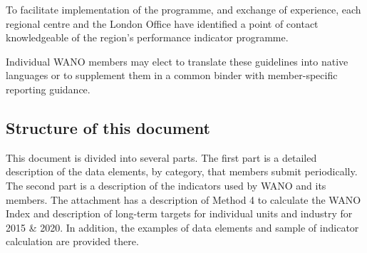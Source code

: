 To facilitate implementation of the programme, and exchange of
experience, each regional centre and the London Office have identified
a point of contact knowledgeable of the region's performance indicator
programme.

Individual WANO members may elect to translate these guidelines into native languages or to supplement them in a common binder with member-specific reporting guidance.
\subsection*{Structure of this document}
This document is divided into several parts. The first part is a detailed description of the data elements, by category, that members submit periodically. The second part is a description of the indicators used by WANO and its members. The attachment has a description of Method 4 to calculate the WANO Index and description of long-term targets for individual units and industry for 2015 \& 2020. In addition, the examples of data elements and sample of indicator calculation are provided there.

